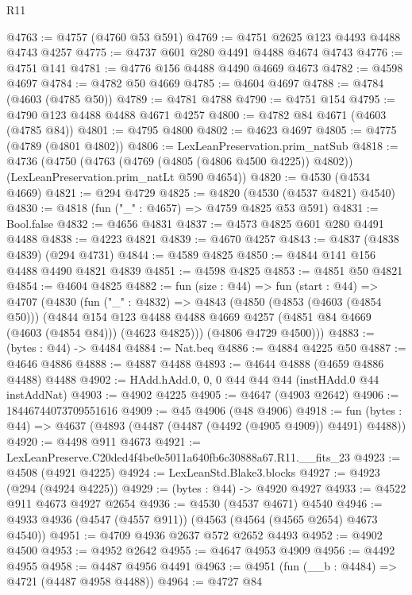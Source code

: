 \begin{lexlean}{R11}
\begin{coremodule}
@4763 := @4757 (@4760 @53 @591)
@4769 := @4751 @2625 @123 @4493 @4488 @4743 @4257
@4775 := @4737 @601 @280 @4491 @4488 @4674 @4743
@4776 := @4751 @141
@4781 := @4776 @156 @4488 @4490 @4669 @4673
@4782 := @4598 @4697
@4784 := @4782 @50 @4669
@4785 := @4604 @4697
@4788 := @4784 (@4603 (@4785 @50))
@4789 := @4781 @4788
@4790 := @4751 @154
@4795 := @4790 @123 @4488 @4488 @4671 @4257
@4800 := @4782 @84 @4671 (@4603 (@4785 @84))
@4801 := @4795 @4800
@4802 := @4623 @4697
@4805 := @4775 (@4789 (@4801 @4802))
@4806 := LexLeanPreservation.prim_natSub
@4818 := @4736
    (@4750
      (@4763 (@4769 (@4805 (@4806 @4500 @4225)) @4802))
      (LexLeanPreservation.prim_natLt @590 @4654))
@4820 := @4530 (@4534 @4669)
@4821 := @294 @4729
@4825 := @4820 (@4530 (@4537 @4821) @4540)
@4830 := @4818 (fun ("_" : @4657) => @4759 @4825 @53 @591)
@4831 := Bool.false
@4832 := @4656 @4831
@4837 := @4573 @4825 @601 @280 @4491 @4488
@4838 := @4223 @4821
@4839 := @4670 @4257
@4843 := @4837 (@4838 @4839) (@294 @4731)
@4844 := @4589 @4825
@4850 := @4844 @141 @156 @4488 @4490 @4821 @4839
@4851 := @4598 @4825
@4853 := @4851 @50 @4821
@4854 := @4604 @4825
@4882 := fun (size : @44) =>
  fun (start : @44) =>
  @4707
    (@4830
      (fun ("_" : @4832) =>
      @4843
        (@4850
          (@4853 (@4603 (@4854 @50)))
          (@4844
            @154
            @123
            @4488
            @4488
            @4669
            @4257
            (@4851 @84 @4669 (@4603 (@4854 @84)))
            (@4623 @4825)))
        (@4806 @4729 @4500)))
@4883 := (bytes : @44) -> @4484
@4884 := Nat.beq
@4886 := @4884 @4225 @50
@4887 := @4646 @4886
@4888 := @4887 @4488
@4893 := @4644 @4888 (@4659 @4886 @4488) @4488
@4902 := HAdd.hAdd.{0, 0, 0} @44 @44 @44 (instHAdd.{0} @44 instAddNat)
@4903 := @4902 @4225
@4905 := @4647 (@4903 @2642)
@4906 := 18446744073709551616
@4909 := @45 @4906 (@48 @4906)
@4918 := fun (bytes : @44) => @4637 (@4893 (@4487 (@4487 (@4492 (@4905 @4909)) @4491) @4488))
@4920 := @4498 @911 @4673
@4921 := LexLeanPreserve.C20ded4f4be0e5011a640fb6c30888a67.R11.__fits_23
@4923 := @4508 (@4921 @4225)
@4924 := LexLeanStd.Blake3.blocks
@4927 := @4923 (@294 (@4924 @4225))
@4929 := (bytes : @44) -> @4920 @4927
@4933 := @4522 @911 @4673 @4927 @2654
@4936 := @4530 (@4537 @4671) @4540
@4946 := @4933 @4936 (@4547 (@4557 @911)) (@4563 (@4564 (@4565 @2654) @4673 @4540))
@4951 := @4709 @4936 @2637 @572 @2652 @4493
@4952 := @4902 @4500
@4953 := @4952 @2642
@4955 := @4647 @4953 @4909
@4956 := @4492 @4955
@4958 := @4487 @4956 @4491
@4963 := @4951 (fun (__b : @4484) => @4721 (@4487 @4958 @4488))
@4964 := @4727 @84

\end{coremodule}
\end{lexlean}
